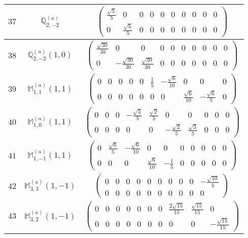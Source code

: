 \documentclass[fleqn,8pt,landscape]{jsarticle}
\begin{document}
\begin{center}
\begin{longtable}{ccc}
$ 37 $ & $ \mathbb{Q}_{2,-2}^{(a)} $ & $ \begin{pmatrix} \frac{\sqrt{5}}{5} & 0 & 0 & 0 & 0 & 0 & 0 & 0 & 0 & 0 \\ 0 & \frac{\sqrt{5}}{5} & 0 & 0 & 0 & 0 & 0 & 0 & 0 & 0 \end{pmatrix} $ \\ \hline
$ 38 $ & $ \mathbb{Q}_{2,-2}^{(a)}(1,0) $ & $ \begin{pmatrix} \frac{\sqrt{30}}{30} & 0 & 0 & 0 & 0 & 0 & 0 & 0 & 0 & 0 \\ 0 & - \frac{\sqrt{30}}{30} & \frac{\sqrt{30}}{30} & 0 & 0 & 0 & 0 & 0 & 0 & 0 \end{pmatrix} $ \\ \hline
$ 39 $ & $ \mathbb{M}_{1,1}^{(a)}(1,1) $ & $ \begin{pmatrix} 0 & 0 & 0 & 0 & 0 & \frac{1}{5} & - \frac{\sqrt{6}}{10} & 0 & 0 & 0 \\ 0 & 0 & 0 & 0 & 0 & 0 & 0 & \frac{\sqrt{6}}{10} & - \frac{\sqrt{6}}{5} & 0 \end{pmatrix} $ \\ \hline
$ 40 $ & $ \mathbb{M}_{1,0}^{(a)}(1,1) $ & $ \begin{pmatrix} 0 & 0 & 0 & - \frac{\sqrt{3}}{5} & \frac{\sqrt{2}}{5} & 0 & 0 & 0 & 0 & 0 \\ 0 & 0 & 0 & 0 & 0 & - \frac{\sqrt{2}}{5} & \frac{\sqrt{3}}{5} & 0 & 0 & 0 \end{pmatrix} $ \\ \hline
$ 41 $ & $ \mathbb{M}_{1,-1}^{(a)}(1,1) $ & $ \begin{pmatrix} 0 & \frac{\sqrt{6}}{5} & - \frac{\sqrt{6}}{10} & 0 & 0 & 0 & 0 & 0 & 0 & 0 \\ 0 & 0 & 0 & \frac{\sqrt{6}}{10} & - \frac{1}{5} & 0 & 0 & 0 & 0 & 0 \end{pmatrix} $ \\ \hline
$ 42 $ & $ \mathbb{M}_{3,3}^{(a)}(1,-1) $ & $ \begin{pmatrix} 0 & 0 & 0 & 0 & 0 & 0 & 0 & 0 & 0 & - \frac{\sqrt{10}}{5} \\ 0 & 0 & 0 & 0 & 0 & 0 & 0 & 0 & 0 & 0 \end{pmatrix} $ \\ \hline
$ 43 $ & $ \mathbb{M}_{3,2}^{(a)}(1,-1) $ & $ \begin{pmatrix} 0 & 0 & 0 & 0 & 0 & 0 & 0 & \frac{2 \sqrt{15}}{15} & \frac{\sqrt{15}}{15} & 0 \\ 0 & 0 & 0 & 0 & 0 & 0 & 0 & 0 & 0 & - \frac{\sqrt{15}}{15} \end{pmatrix} $ \\ \hline

\end{longtable}
\end{center}
\end{document}
